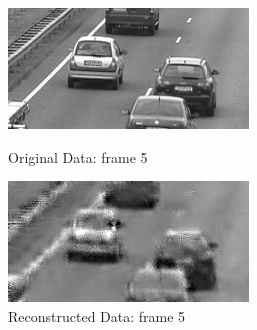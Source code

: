 \documentclass[12pt]{article}
\begin{document}
\begin{itemize}
\begin{enumerate}
    \begin{figure}[H]
        \centering
        \begin{minipage}{.45\textwidth}
            \centering
            \includegraphics[width=\linewidth]{results/cars_7_orig_5.png}
            \caption*{Original Data: frame 5}
        \end{minipage}
        \begin{minipage}{.45\textwidth}
            \centering
            \includegraphics[width=\linewidth]{results/cars_7_recon_5.png}
            \caption*{Reconstructed Data: frame 5}
        \end{minipage}
    \end{figure}


\end{enumerate}
\end{itemize}
\end{document}
